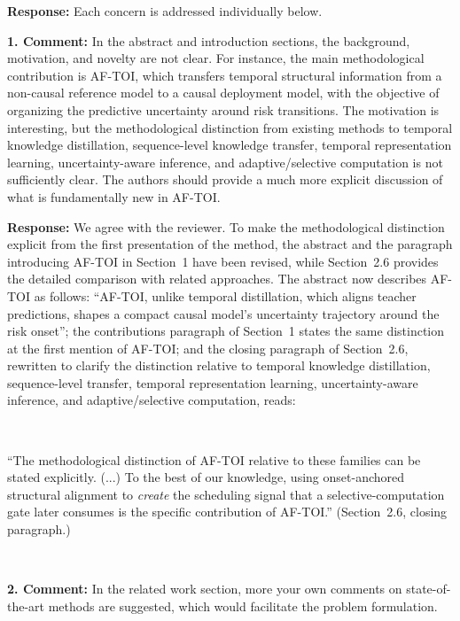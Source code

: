 \documentclass[1p,12pt,authoryear]{elsarticle}
\begin{document}
\vspace{2mm}
\noindent \textbf{Response:} Each concern is addressed individually below.

\vspace{0.5cm}
\noindent \textbf{1. Comment:} In the abstract and introduction sections, the background, motivation, and novelty are not clear. For instance, the main methodological contribution is AF-TOI, which transfers temporal structural information from a non-causal reference model to a causal deployment model, with the objective of organizing the predictive uncertainty around risk transitions. The motivation is interesting, but the methodological distinction from existing methods to temporal knowledge distillation, sequence-level knowledge transfer, temporal representation learning, uncertainty-aware inference, and adaptive/selective computation is not sufficiently clear. The authors should provide a much more explicit discussion of what is fundamentally new in AF-TOI.

\vspace{2mm}
\noindent \textbf{Response:} We agree with the reviewer. To make the methodological distinction explicit from the first presentation of the method, the abstract and the paragraph introducing AF-TOI in Section~1 have been revised, while Section~2.6 provides the detailed comparison with related approaches. The abstract now describes AF-TOI as follows: ``AF-TOI, unlike temporal distillation, which aligns teacher predictions, shapes a compact causal model's uncertainty trajectory around the risk onset''; the contributions paragraph of Section~1 states the same distinction at the first mention of AF-TOI; and the closing paragraph of Section~2.6, rewritten to clarify the distinction relative to temporal knowledge distillation, sequence-level transfer, temporal representation learning, uncertainty-aware inference, and adaptive/selective computation, reads:

~

``The methodological distinction of AF-TOI relative to these families can be stated explicitly. (...) To the best of our knowledge, using onset-anchored structural alignment to \emph{create} the scheduling signal that a selective-computation gate later consumes is the specific contribution of AF-TOI.'' (Section~2.6, closing paragraph.)

~

\noindent \textbf{2. Comment:} In the related work section, more your own comments on state-of-the-art methods are suggested, which would facilitate the problem formulation.
\end{document}
